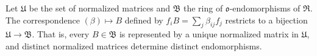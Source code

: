 Let $\mathfrak{U}$ be the set of normalized matrices and $\mathfrak{B}$ the ring of $\mathfrak{o}$-endomorphisms of $\mathfrak{R}$. The correspondence $(\beta) \mapsto B$ defined by $f_i B = \sum_j \beta_{ij} f_j$ restricts to a bijection $\mathfrak{U} \to \mathfrak{B}$. That is, every $B \in \mathfrak{B}$ is represented by a unique normalized matrix in $\mathfrak{U}$, and distinct normalized matrices determine distinct endomorphisms.

